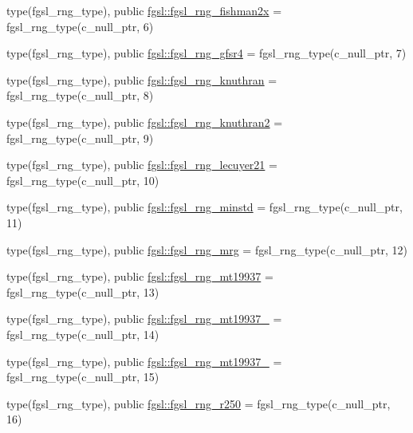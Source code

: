 \begin{DoxyCompactItemize}
\item 
type(fgsl\+\_\+rng\+\_\+type), public \hyperlink{namespacefgsl_a6564b2d833a35c41a82dc834f2cc3263}{fgsl\+::fgsl\+\_\+rng\+\_\+fishman2x} = fgsl\+\_\+rng\+\_\+type(c\+\_\+null\+\_\+ptr, 6)
\item 
type(fgsl\+\_\+rng\+\_\+type), public \hyperlink{namespacefgsl_a12158a5916e899c6bf9c9ceee7352105}{fgsl\+::fgsl\+\_\+rng\+\_\+gfsr4} = fgsl\+\_\+rng\+\_\+type(c\+\_\+null\+\_\+ptr, 7)
\item 
type(fgsl\+\_\+rng\+\_\+type), public \hyperlink{namespacefgsl_af73840b5889e5a54be83e7596d5973c0}{fgsl\+::fgsl\+\_\+rng\+\_\+knuthran} = fgsl\+\_\+rng\+\_\+type(c\+\_\+null\+\_\+ptr, 8)
\item 
type(fgsl\+\_\+rng\+\_\+type), public \hyperlink{namespacefgsl_a528795b3607aafcfc90f8615237804fa}{fgsl\+::fgsl\+\_\+rng\+\_\+knuthran2} = fgsl\+\_\+rng\+\_\+type(c\+\_\+null\+\_\+ptr, 9)
\item 
type(fgsl\+\_\+rng\+\_\+type), public \hyperlink{namespacefgsl_a636f91cce473d59c5b32c77a329f4486}{fgsl\+::fgsl\+\_\+rng\+\_\+lecuyer21} = fgsl\+\_\+rng\+\_\+type(c\+\_\+null\+\_\+ptr, 10)
\item 
type(fgsl\+\_\+rng\+\_\+type), public \hyperlink{namespacefgsl_a9bc7cd5586595c2ac502e3f6496869a9}{fgsl\+::fgsl\+\_\+rng\+\_\+minstd} = fgsl\+\_\+rng\+\_\+type(c\+\_\+null\+\_\+ptr, 11)
\item 
type(fgsl\+\_\+rng\+\_\+type), public \hyperlink{namespacefgsl_a598ecc30ecba7ed571bf0d76f66cc23f}{fgsl\+::fgsl\+\_\+rng\+\_\+mrg} = fgsl\+\_\+rng\+\_\+type(c\+\_\+null\+\_\+ptr, 12)
\item 
type(fgsl\+\_\+rng\+\_\+type), public \hyperlink{namespacefgsl_ac85f5a9aab93968683416a0bf672122d}{fgsl\+::fgsl\+\_\+rng\+\_\+mt19937} = fgsl\+\_\+rng\+\_\+type(c\+\_\+null\+\_\+ptr, 13)
\item 
type(fgsl\+\_\+rng\+\_\+type), public \hyperlink{namespacefgsl_a9e349dde1852d8ef9eb4bbdcc9de661a}{fgsl\+::fgsl\+\_\+rng\+\_\+mt19937\+\_} = fgsl\+\_\+rng\+\_\+type(c\+\_\+null\+\_\+ptr, 14)
\item 
type(fgsl\+\_\+rng\+\_\+type), public \hyperlink{namespacefgsl_a984a8a295a9ec6b581b70421f780df53}{fgsl\+::fgsl\+\_\+rng\+\_\+mt19937\+\_} = fgsl\+\_\+rng\+\_\+type(c\+\_\+null\+\_\+ptr, 15)
\item 
type(fgsl\+\_\+rng\+\_\+type), public \hyperlink{namespacefgsl_ada1200ead9fd55af5e211bdd3666dea1}{fgsl\+::fgsl\+\_\+rng\+\_\+r250} = fgsl\+\_\+rng\+\_\+type(c\+\_\+null\+\_\+ptr, 16)
\item 

\end{DoxyCompactItemize}
